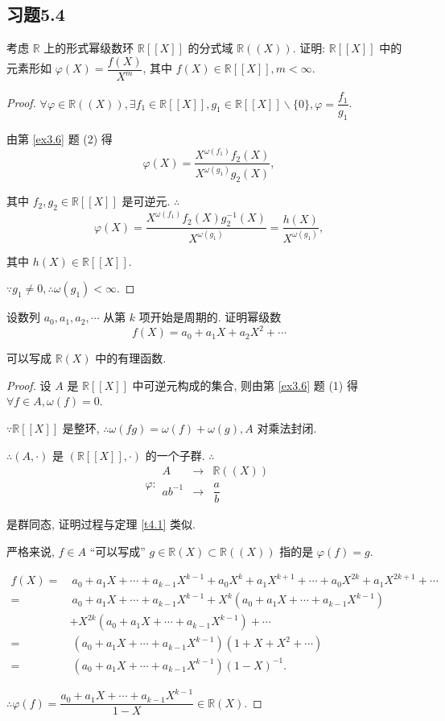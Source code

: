 \documentclass[UTF8]{ctexart}
\begin{document}
\subsection{习题5.4}
\begin{exercise}%
    考虑 $\mathbb{R}$ 上的形式幂级数环 $\mathbb{R}[[X]]$ 的分式域 $\mathbb{R}((X))$. 证明: $\mathbb{R}[[X]]$ 中的元素形如 $\varphi(X)=\dfrac{f(X)}{X^m}$, 其中 $f(X)\in\mathbb{R}[[X]],m<\infty$.
\end{exercise}
\begin{proof}
    $\forall\varphi\in\mathbb{R}((X)),\exists f_1\in\mathbb{R}[[X]],g_1\in\mathbb{R}[[X]]\backslash\{0\},\varphi=\dfrac{f_1}{g_1}$.

    由第 \ref{ex3.6} 题 (2) 得
    \[\varphi(X)=\dfrac{X^{\omega(f_1)}f_2(X)}{X^{\omega(g_1)}g_2(X)},\]

    其中 $f_2,g_2\in\mathbb{R}[[X]]$ 是可逆元. $\therefore$
    \[\varphi(X)=\dfrac{X^{\omega(f_1)}f_2(X)g^{-1}_2(X)}{X^{\omega(g_1)}}=\dfrac{h(X)}{X^{\omega(g_1)}},\]

    其中 $h(X)\in\mathbb{R}[[X]]$.

    $\because g_1\neq0,\therefore\omega(g_1)<\infty$.
\end{proof}
\begin{exercise}%
    设数列 $a_0,a_1,a_2,\cdots$ 从第 $k$ 项开始是周期的. 证明幂级数
    \[f(X)=a_0+a_1X+a_2X^2+\cdots\]

    可以写成 $\mathbb{R}(X)$ 中的有理函数.
\end{exercise}
\begin{proof}
    设 $A$ 是 $\mathbb{R}[[X]]$ 中可逆元构成的集合, 则由第 \ref{ex3.6} 题 (1) 得 $\forall f\in A,\omega(f)=0$.

    $\because\mathbb{R}[[X]]$ 是整环, $\therefore\omega(fg)=\omega(f)+\omega(g),A$ 对乘法封闭.

    $\therefore(A,\cdot)$ 是 $(\mathbb{R}[[X]],\cdot)$ 的一个子群. $\therefore$
    \[\varphi:\begin{array}{rcl}
        A & \to & \mathbb{R}((X)) \\
        ab^{-1} & \to & \dfrac{a}{b}
    \end{array}\]

    是群同态, 证明过程与定理 \ref{t4.1} 类似.

    严格来说, $f\in A$ ``可以写成'' $g\in\mathbb{R}(X)\subset\mathbb{R}((X))$ 指的是 $\varphi(f)=g$.

    \begin{align*}
        f(X)= & \ a_0+a_1X+\cdots+a_{k-1}X^{k-1}+a_0X^k+a_1X^{k+1}+\cdots+a_0X^{2k}+a_1X^{2k+1}+\cdots \\
        = & \ a_0+a_1X+\cdots+a_{k-1}X^{k-1}+X^k(a_0+a_1X+\cdots+a_{k-1}X^{k-1}) \\
        & +X^{2k}(a_0+a_1X+\cdots+a_{k-1}X^{k-1})+\cdots \\
        = & \ (a_0+a_1X+\cdots+a_{k-1}X^{k-1})(1+X+X^2+\cdots) \\
        = & \ (a_0+a_1X+\cdots+a_{k-1}X^{k-1})(1-X)^{-1}.
    \end{align*}

    $\therefore\varphi(f)=\dfrac{a_0+a_1X+\cdots+a_{k-1}X^{k-1}}{1-X}\in\mathbb{R}(X)$.
\end{proof}
\end{document}
